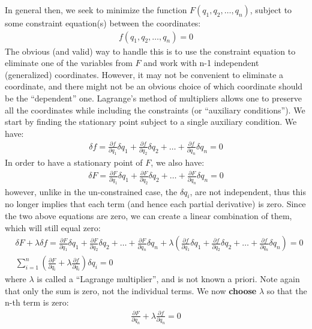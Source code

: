 In general then, we seek to minimize the function $F(q_1, q_2, \dots, q_n)$, subject to some constraint equation(s) between the coordinates:
\begin{align}
f(q_1, q_2, \dots, q_n)=0
\end{align}
The obvious (and valid) way to handle this is to use the constraint equation to eliminate one of the variables from $F$ and work with n-1 independent (generalized) coordinates. However, it may not be convenient to eliminate a coordinate, and there might not be an obvious choice of which coordinate should be the ``dependent'' one. Lagrange's method of multipliers allows one to preserve all the coordinates while including the constraints (or ``auxiliary conditions''). We start by finding the stationary point subject to a single auxiliary condition. We have:
\begin{align}
\delta f=\frac{\partial f}{\partial q_1}\delta q_1 + \frac{\partial f}{\partial q_2}\delta q_2 +\dots+\frac{\partial f}{\partial q_n}\delta q_n=0
\end{align}
In order to have a stationary point of $F$, we also have:
\begin{align}
\delta F=\frac{\partial F}{\partial q_1}\delta q_1 + \frac{\partial F}{\partial q_2}\delta q_2 +\dots+\frac{\partial F}{\partial q_n}\delta q_n=0
\end{align}
however, unlike in the un-constrained case, the $\delta q_i$, are not independent, thus this no longer implies that each term (and hence each partial derivative) is zero. Since the two above equations are zero, we can create a linear combination of them, which will still equal zero:
\begin{align}
&\delta F+\lambda \delta f=\frac{\partial F}{\partial q_1}\delta q_1 + \frac{\partial F}{\partial q_2}\delta q_2 +\dots+\frac{\partial F}{\partial q_n}\delta q_n + \lambda (\frac{\partial f}{\partial q_1}\delta q_1 + \frac{\partial f}{\partial q_2}\delta q_2 +\dots+\frac{\partial f}{\partial q_n}\delta q_n)=0\nonumber\\
&\sum_{i=1}^{n} \left(\frac{\partial F}{\partial q_i}+ \lambda \frac{\partial f}{\partial q_i}\right)\delta q_i=0
\end{align}
where $\lambda$ is called a ``Lagrange multiplier'', and is not known a priori. Note again that only the sum is zero, not the individual terms. We now \textbf{choose} $\lambda$ so that the n-th term is zero:
\begin{align}
\frac{\partial F}{\partial q_n}+ \lambda \frac{\partial f}{\partial q_n}=0
\end{align}
